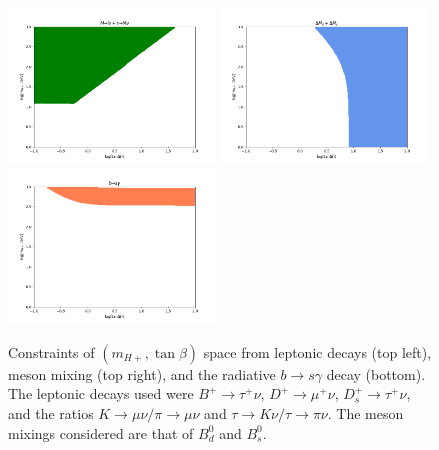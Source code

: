 \documentclass[a4paper,12pt]{article}
\begin{document}
\begin{figure}[ht]
    \vspace{-12pt}
    \centering
    \includegraphics[width=0.49\textwidth]{leps.png}
    \includegraphics[width=0.49\textwidth]{bmix.png}
    \includegraphics[width=0.49\textwidth]{bsgam.png}
    \caption{\label{fig:indies}Constraints of $(m_{H+},\tan\beta)$ space from leptonic decays (top left), meson mixing (top right), and the radiative $b\to s\gamma$ decay (bottom). The leptonic decays used were $B^+\to\tau^+\nu$, $D^+\to\mu^+\nu$, $D_s^+\to\tau^+\nu$, and the ratios $K\to\mu\nu/\pi\to\mu\nu$ and $\tau\to K\nu/\tau\to\pi\nu$. The meson mixings considered are that of $B^0_d$ and $B_s^0$.}
\end{figure}
\end{document}
